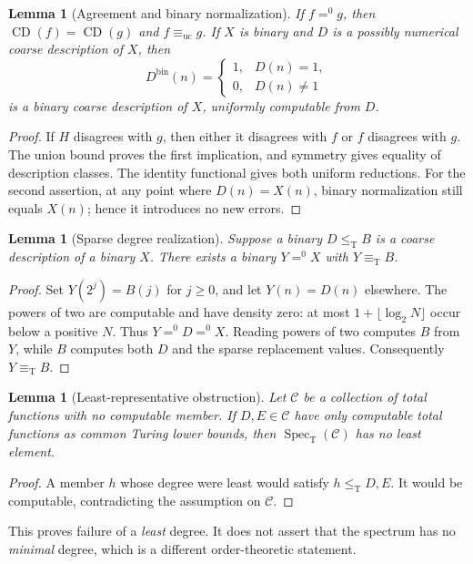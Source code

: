 \documentclass[11pt,a4paper]{article}
\newcommand{\leT}{\leq_{\mathrm T}}
\newcommand{\eqT}{\equiv_{\mathrm T}}
\newcommand{\equc}{\equiv_{\mathrm{uc}}}
\newcommand{\az}{\mathrel{=^{0}}}
\newcommand{\CD}{\operatorname{CD}}
\newcommand{\Spec}{\operatorname{Spec}_{\mathrm T}}
\newtheorem{lemma}[theorem]{Lemma}
\theoremstyle{definition}\newtheorem{definition}[theorem]{Definition}
\theoremstyle{remark}\newtheorem{remark}[theorem]{Remark}
\begin{document}
\begin{lemma}[Agreement and binary normalization]\label{lem:basic}
If $f\az g$, then $\CD(f)=\CD(g)$ and $f\equc g$. If $X$ is binary and $D$ is a possibly numerical coarse description of $X$, then
\[
 D^{\mathrm{bin}}(n)=\begin{cases}1,&D(n)=1,\\0,&D(n)\ne1\end{cases}
\]
is a binary coarse description of $X$, uniformly computable from $D$.
\end{lemma}
\begin{proof}
If $H$ disagrees with $g$, then either it disagrees with $f$ or $f$ disagrees with $g$. The union bound proves the first implication, and symmetry gives equality of description classes. The identity functional gives both uniform reductions. For the second assertion, at any point where $D(n)=X(n)$, binary normalization still equals $X(n)$; hence it introduces no new errors.
\end{proof}

\begin{lemma}[Sparse degree realization]\label{lem:sparse}
Suppose a binary $D\leT B$ is a coarse description of a binary $X$. There exists a binary $Y\az X$ with $Y\eqT B$.
\end{lemma}
\begin{proof}
Set $Y(2^j)=B(j)$ for $j\geq0$, and let $Y(n)=D(n)$ elsewhere. The powers of two are computable and have density zero: at most $1+\lfloor\log_2 N\rfloor$ occur below a positive $N$. Thus $Y\az D\az X$. Reading powers of two computes $B$ from $Y$, while $B$ computes both $D$ and the sparse replacement values. Consequently $Y\eqT B$.
\end{proof}

\begin{lemma}[Least-representative obstruction]\label{lem:obstruction}
Let $\mathcal C$ be a collection of total functions with no computable member. If $D,E\in\mathcal C$ have only computable total functions as common Turing lower bounds, then $\Spec(\mathcal C)$ has no least element.
\end{lemma}
\begin{proof}
A member $h$ whose degree were least would satisfy $h\leT D,E$. It would be computable, contradicting the assumption on $\mathcal C$.
\end{proof}
This proves failure of a \emph{least} degree. It does not assert that the spectrum has no \emph{minimal} degree, which is a different order-theoretic statement.
\end{document}

